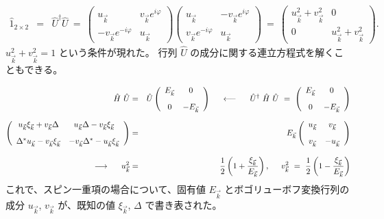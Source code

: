 \documentclass[uplatex,a4j,12pt,dvipdfmx]{jsarticle}
\begin{document}
\begin{eqnarray}
	\hat{1}_{2 \times 2}
	&=&
	\hat{U}^{\dagger}
	\hat{U}
	\ = \
	\left(
	\begin{array}{cc}
			u_{\vec{k}}                   & v_{\vec{k}} e^{i \varphi}
			\\[3mm]
			- v_{\vec{k}} e^{- i \varphi} & u_{\vec{k}}
		\end{array}
	\right)
	\!\!\!
	\left(
	\begin{array}{cc}
			u_{\vec{k}}                 & - v_{\vec{k}} e^{i \varphi}
			\\[3mm]
			v_{\vec{k}} e^{- i \varphi} & u_{\vec{k}}
		\end{array}
	\right)
	\ = \
	\left(
	\begin{array}{cc}
			u_{\vec{k}}^{2} + v_{\vec{k}}^{2} & 0
			\\[3mm]
			0                                 & u_{\vec{k}}^{2} + v_{\vec{k}}^{2}
		\end{array}
	\right)
	.
\end{eqnarray}
%
$u_{\vec{k}}^{2} + v_{\vec{k}}^{2} = 1$ という条件が現れた。
行列 $\hat{U}$ の成分に関する連立方程式を解くこともできる。

\begin{eqnarray}
	\hat{H}
	\
	\hat{U}
	&=&
	\hat{U}
	\left(
	\begin{array}{cc}
			E_{\vec{k}} & 0
			\\[3mm]
			0           & - E_{\vec{k}}
		\end{array}
	\right)
	\hspace{5mm}
	\longleftarrow
	\hspace{5mm}
	\hat{U}^{\dagger}
	\
	\hat{H}
	\
	\hat{U}
	\ = \
	\left(
	\begin{array}{cc}
			E_{\vec{k}} & 0
			\\[3mm]
			0           & - E_{\vec{k}}
		\end{array}
	\right)
	\\[2mm]
	\left(
	\begin{array}{cc}
			u_{\vec{k}} \xi_{\vec{k}} + v_{\vec{k}} \Delta     & u_{\vec{k}} \Delta - v_{\vec{k}} \xi_{\vec{k}}
			\\[3mm]
			\Delta^{*} u_{\vec{k}} - v_{\vec{k}} \xi_{\vec{k}} & - v_{\vec{k}} \Delta^{*} - u_{\vec{k}} \xi_{\vec{k}}
		\end{array}
	\right)
	&=&
	E_{\vec{k}}
	\left(
	\begin{array}{cc}
			u_{\vec{k}} & v_{\vec{k}}
			\\[3mm]
			v_{\vec{k}} & - u_{\vec{k}}
		\end{array}
	\right)
	\\[3mm]
	\longrightarrow
	\hspace{5mm}
	u_{\vec{k}}^{2}
	&=&
	\dfrac{1}{2} \left( 1 + \dfrac{\xi_{\vec{k}}}{E_{\vec{k}}} \right)
	, \hspace{5mm}
	v_{\vec{k}}^{2}
	\ = \
	\dfrac{1}{2} \left( 1 - \dfrac{\xi_{\vec{k}}}{E_{\vec{k}}} \right)
\end{eqnarray}
%
これで、スピン一重項の場合について、固有値 $E_{\vec{k}}$ とボゴリューボフ変換行列の成分 $u_{\vec{k}}$, $v_{\vec{k}}$ が、既知の値 $\xi_{\vec{k}}$, $\Delta$ で書き表された。
\end{document}
